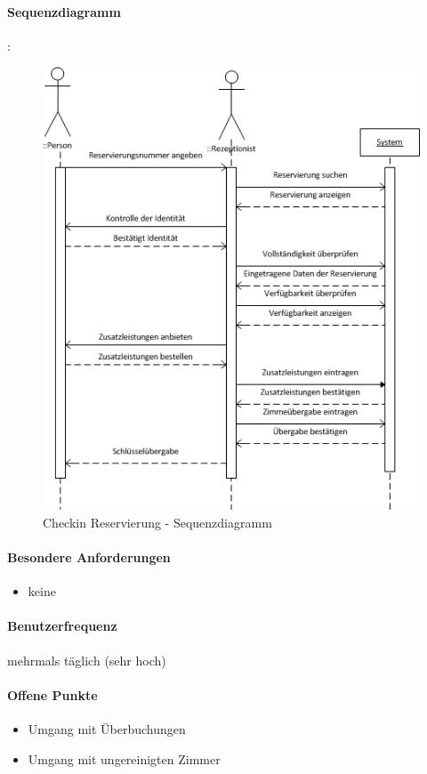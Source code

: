 \paragraph{Sequenzdiagramm}
:\\
\begin{figure}[h]
	\includegraphics[width=\linewidth]{Images/SSD_Checkin_Reservierung.png}
	\caption{Checkin Reservierung - Sequenzdiagramm}
\end{figure}

\paragraph{Besondere Anforderungen}
\begin{itemize}
	\item keine
\end{itemize}

\paragraph{Benutzerfrequenz}
mehrmals täglich (sehr hoch)

\paragraph{Offene Punkte}
\begin{itemize}
	\item Umgang mit Überbuchungen
	\item Umgang mit ungereinigten Zimmer
\end{itemize}

\newpage

